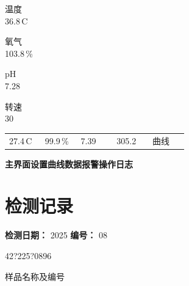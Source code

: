 \documentclass[UTF8,10pt,a4paper,fontset=fandol]{ctexart}
\newcommand{\fieldvalue}[1]{#1}
\newcommand{\handwritten}[1]{#1}
\begin{document}
\begin{minipage}{\linewidth}
\begin{minipage}[t]{\linewidth}
\medskip
温度\\[-2pt]
\fieldvalue{36.8\,\textdegree C}

\medskip
氧气\\[-2pt]
\fieldvalue{103.8\,\%}

\medskip
pH\\[-2pt]
\fieldvalue{7.28}

\medskip
转速\\[-2pt]
\fieldvalue{30\,}
\end{minipage}

\medskip
\noindent
\begin{tabular}{@{}p{0.18\linewidth}p{0.18\linewidth}p{0.18\linewidth}p{0.18\linewidth}p{0.18\linewidth}@{}}
\centering
\fieldvalue{27.4\,\textdegree C}
&
\centering
\fieldvalue{99.9\,\%}
&
\centering
\fieldvalue{7.39}
&
\centering
\fieldvalue{305.2}
&
\centering
曲线
\end{tabular}

\medskip
\noindent
\textbf{主界面}\qquad \textbf{设置}\qquad \textbf{曲线}\qquad \textbf{数据}\qquad \textbf{报警}\qquad \textbf{操作日志}

\end{minipage}

\newpage

\section{检测记录}

\noindent
\textbf{检测日期：}
\fieldvalue{2025}
\qquad
\textbf{编号：}
\fieldvalue{08}

\vspace{0.5em}

\noindent
\handwritten{42?225?0896}

\handwritten{样品名称及编号}
\end{document}
